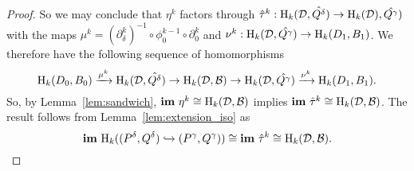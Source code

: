 \begin{proof}
  So we may conclude that $\eta^k$ factors through $\hat{\tau}^k : \mathrm{H}_k({\mathcal{D}}, \hat{Q^\delta})\to \mathrm{H}_k({\mathcal{D}}), \hat{Q^\gamma})$ with the maps $\mu^k = (\partial^k_\delta)^{-1}\circ \phi_0^{k-1}\circ\partial_0^k$ and $\nu^k : \mathrm{H}_k({\mathcal{D}}, \hat{Q^\gamma}) \to \mathrm{H}_k(D_1, B_1)$.
  We therefore have the following sequence of homomorphisms
  \[ \mathrm{H}_k(D_0, B_0)\xrightarrow{\mu^k} \mathrm{H}_k({\mathcal{D}}, \hat{Q^\delta})\to\mathrm{H}_k({\mathcal{D}}, {\mathcal{B}})\to\mathrm{H}_k({\mathcal{D}}, \hat{Q^\gamma})\xrightarrow{\nu^k} \mathrm{H}_k(D_1, B_1).\]
  So, by Lemma~\ref{lem:sandwich}, $\mathbf{im}~\eta^k\cong \mathrm{H}_k({\mathcal{D}}, {\mathcal{B}})$ implies $\mathbf{im}~\hat{\tau}^k\cong \mathrm{H}_k({\mathcal{D}}, {\mathcal{B}})$.
  The result follows from Lemma~\ref{lem:extension_iso} as
  \[ \mathbf{im}~\mathrm{H}_k((P^\delta, Q^\delta)\hookrightarrow (P^\gamma, Q^\gamma))\cong\mathbf{im}~\hat{\tau}^k\cong \mathrm{H}_k({\mathcal{D}}, {\mathcal{B}}).\]
\end{proof}
